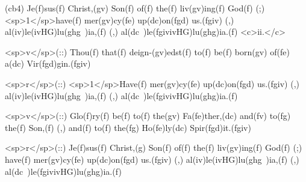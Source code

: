 (cb4) Je(f)sus(f) Christ,(gv) Son(f) of(f) the(f) liv(gv)ing(f) God(f) (;) <sp>1</sp>have(f) mer(gv)cy(fe) up(dc)on(fgd) us.(fgiv) (,) al(iv)le(ivHG)lu(ghg~)ia,(f) (,) al(dc~)le(fgivivHG)lu(ghg)ia.(f) <c>ii.</c>

<sp>v</sp>(::) Thou(f) that(f) deign-(gv)edst(f) to(f) be(f) born(gv) of(fe) a(dc) Vir(fgd)gin.(fgiv)

<sp>r</sp>(::) <sp>1</sp>Have(f) mer(gv)cy(fe) up(dc)on(fgd) us.(fgiv) (,) al(iv)le(ivHG)lu(ghg~)ia,(f) (,) al(dc~)le(fgivivHG)lu(ghg)ia.(f)

<sp>v</sp>(::) Glo(f)ry(f) be(f) to(f) the(gv) Fa(fe)ther,(dc) and(fv) to(fg) the(f) Son,(f) (,) and(f) to(f) the(fg) Ho(fe)ly(dc) Spir(fgd)it.(fgiv) 

<sp>r</sp>(::) Je(f)sus(f) Christ,(g) Son(f) of(f) the(f) liv(gv)ing(f) God(f) (;) have(f) mer(gv)cy(fe) up(dc)on(fgd) us.(fgiv) (,) al(iv)le(ivHG)lu(ghg~)ia,(f) (,) al(dc~)le(fgivivHG)lu(ghg)ia.(f)